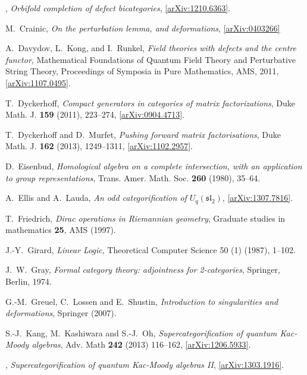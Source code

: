 \documentclass[english,letter paper,12pt,leqno]{article}
\theoremstyle{example}
\numberwithin{equation}{section}
\begin{document}
\begin{thebibliography}{BHLS03}
\bysame, \textsl{Orbifold completion of defect bicategories}, 
\href{http://arxiv.org/abs/1210.6363}{[arXiv:1210.6363]}.

M.~Crainic, \emph{On the perturbation lemma, and deformations}, \href{http://arxiv.org/abs/math/0403266}{[arXiv:0403266]}

A.~Davydov, L.~Kong, and I.~Runkel, \textsl{Field theories with defects and the
  centre functor}, Mathematical Foundations of Quantum Field Theory and Perturbative String Theory, 
  Proceedings of Symposia in Pure Mathematics, AMS, 2011, \href{http://arxiv.org/abs/1107.0495}{[arXiv:1107.0495]}.
  
T.~Dyckerhoff, \textsl{Compact generators in categories of matrix factorizations},
  Duke Math. J. \textbf{159} (2011), 223--274,
  \href{http://arxiv.org/abs/0904.4713}{[arXiv:0904.4713]}.

T.~Dyckerhoff and D.~Murfet, \textsl{Pushing forward matrix factorisations}, Duke Math. J. \textbf{162} (2013), 1249--1311, \href{http://arxiv.org/abs/1102.2957}{[arXiv:1102.2957]}.

D.~Eisenbud, \textsl{Homological algebra on a complete intersection, with an application to group representations}, Trans. Amer. Math. Soc. \textbf{260} (1980), 35--64.

A.~Ellis and A.~Lauda, \textsl{An odd categorification of $U_q(\mathfrak{sl}_2)$}, \href{http://arxiv.org/abs/1307.7816}{[arXiv:1307.7816]}.

T.~Friedrich, \textsl{{D}irac operations in {R}iemannian geometry}, Graduate studies in mathematics \textbf{25}, AMS (1997).

J.-Y.~Girard, \textsl{Linear Logic}, Theoretical Computer Science 50 (1) (1987), 1--102.
  
J.~W.~Gray, \textsl{Formal category theory: adjointness for 2-categories}, Springer, Berlin, 1974.

G.-M.~Greuel, C.~Lossen and E.~Shustin, \textsl{Introduction to singularities and deformations}, Springer (2007).

S.-J.~Kang, M.~Kashiwara and S.-J.~Oh, \textsl{Supercategorification of quantum Kac-Moody algebras}, Adv. Math \textbf{242} (2013) 116--162, \href{http://arxiv.org/abs/1206.5933}{[arXiv:1206.5933]}.

\bysame, \textsl{Supercategorification of quantum Kac-Moody algebras II}, \href{http://arxiv.org/abs/1303.1916}{[arXiv:1303.1916]}.


\end{thebibliography}
\end{document}
